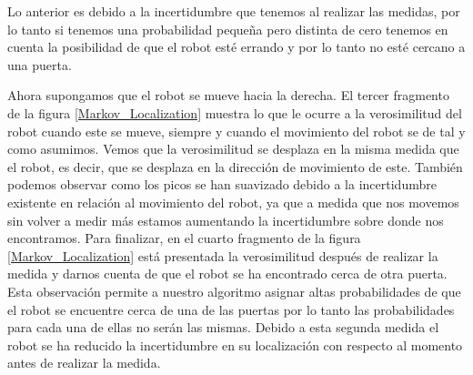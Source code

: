 %
%
%
Lo anterior es debido a la incertidumbre que tenemos al realizar las medidas, por lo tanto si tenemos una probabilidad pequeña pero distinta de cero tenemos en cuenta la posibilidad de que el robot esté errando y por lo tanto no esté cercano a una puerta. 
%
%
%
%
%
%
%
%
%
%
%
%
%
%
%
%

Ahora supongamos que el robot se mueve hacia la derecha. El tercer fragmento de la figura \ref{Markov_Localization} muestra lo que le ocurre a la verosimilitud del robot cuando este se mueve, siempre y cuando el movimiento del robot se de tal y como asumimos. Vemos que la verosimilitud se desplaza en la misma medida que el robot, es decir, que se desplaza en la dirección de movimiento de este. También podemos observar como los picos se han suavizado debido a la incertidumbre existente en relación al movimiento del robot, ya que a medida que nos movemos sin volver a medir más estamos aumentando la incertidumbre sobre donde nos encontramos. Para finalizar, en el cuarto fragmento de la figura \ref{Markov_Localization} está presentada la verosimilitud después de realizar la medida y darnos cuenta de que el robot se ha encontrado cerca de otra puerta. Esta observación permite a nuestro algoritmo asignar altas probabilidades de que el robot se encuentre cerca de una de las puertas por lo tanto las probabilidades para cada una de ellas no serán las mismas. Debido a esta segunda medida el robot se ha reducido la incertidumbre en su localización con respecto al momento antes de realizar la medida.
%
%
%

